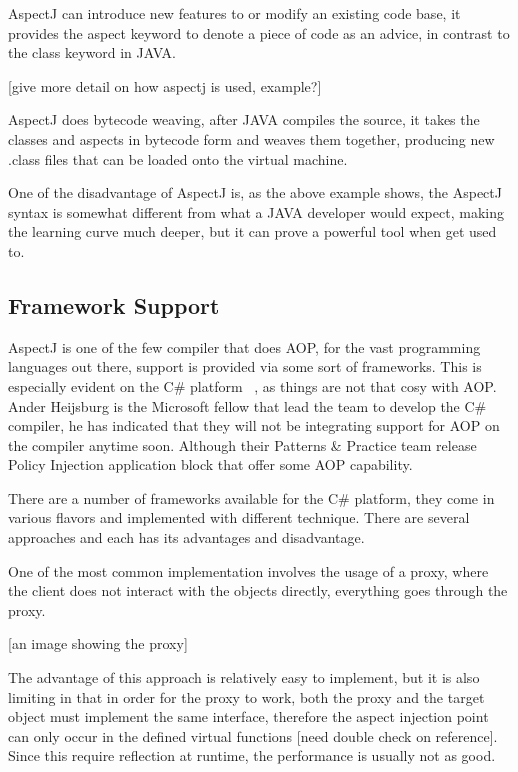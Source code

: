 AspectJ can introduce new features to or modify an existing code base, it provides the aspect keyword to denote a piece of code as an advice, in contrast to the class keyword in JAVA.

[give more detail on how aspectj is used, example?]

AspectJ does bytecode weaving, after JAVA compiles the source, it takes the classes and aspects in bytecode form and weaves them together, producing new .class files that can be loaded onto the virtual machine.

One of the disadvantage of AspectJ is, as the above example shows, the AspectJ syntax is somewhat different from what a JAVA developer would expect, making the learning curve much deeper, but it can prove a powerful tool when get used to.

\subsection{Framework Support}

AspectJ is one of the few compiler that does AOP, for the vast programming languages out there, support is provided via some sort of frameworks. This is especially evident on the C\# platform ~\cite{aopcs}, as things are not that cosy with AOP. Ander Heijsburg is the Microsoft fellow that lead the team to develop the C\# compiler, he has indicated that they will not be integrating support for AOP on the compiler anytime soon. Although their Patterns \& Practice team release Policy Injection application block that offer some AOP capability.

There are a number of frameworks available for the C\# platform, they come in various flavors and implemented with different technique. There are several approaches and each has its advantages and disadvantage.

One of the most common implementation involves the usage of a proxy, where the client does not interact with the objects directly, everything goes through the proxy.

[an image showing the proxy]

The advantage of this approach is relatively easy to implement, but it is also limiting in that in order for the proxy to work, both the proxy and the target object must implement the same interface, therefore the aspect injection point can only occur in the defined virtual functions [need double check on reference]. Since this require reflection at runtime, the performance is usually not as good.

